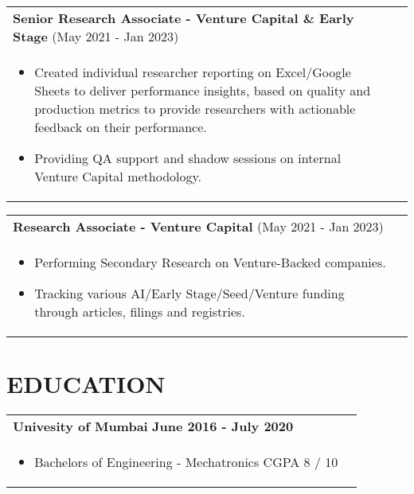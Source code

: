 \documentclass[a4paper,8pt]{article}
\begin{document}
\begin{tabularx}{\linewidth}{ @{}l r@{} }
\textbf{Senior Research Associate - Venture Capital \& Early Stage} (May 2021 - Jan 2023) \\[4pt]
\begin{minipage}[t]{\linewidth}
    \begin{itemize}[nosep,after=\strut, leftmargin=1em, itemsep=2pt]
        \item Created individual researcher reporting on Excel/Google Sheets to deliver performance insights, based on quality and production metrics to provide researchers with actionable feedback on their performance.
        \item Providing QA support and shadow sessions on internal Venture Capital methodology.
    \end{itemize}
\end{minipage}
\end{tabularx}

\begin{tabularx}{\linewidth}{ @{}l r@{} }
\textbf{Research Associate - Venture Capital} (May 2021 - Jan 2023) \\[4pt]
\begin{minipage}[t]{\linewidth}
    \begin{itemize}[nosep,after=\strut, leftmargin=1em, itemsep=2pt]
        \item Performing Secondary Research on Venture-Backed companies.
        \item Tracking various AI/Early Stage/Seed/Venture funding through articles, filings and registries.
    \end{itemize}
\end{minipage}
\vspace{2mm}
\end{tabularx}

\section{\textbf{EDUCATION}}
\vspace{2mm}
\begin{tabularx}{\linewidth}{ @{}l r@{}}
\textbf{Univesity of Mumbai} \hfill \textbf{June 2016 - July 2020} \\[4pt]
\begin{minipage}[t]{\linewidth}
    \begin{itemize}[nosep,after=\strut, leftmargin=1em, itemsep=2pt]
        \item Bachelors of Engineering - Mechatronics \hfill CGPA 8 / 10
    \end{itemize}
\end{minipage}
\vspace{2mm}
\end{tabularx}
\end{document}
